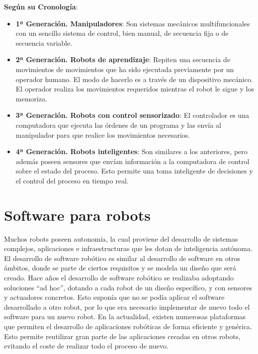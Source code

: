 \textbf{Según su Cronología}:
\begin{itemize}
\item \textbf{1ª Generación. Manipuladores}: Son sistemas mecánicos multifuncionales con un sencillo sistema de control, bien manual, de secuencia fija o de secuencia variable.

\item \textbf{2ª Generación. Robots de aprendizaje}: Repiten una secuencia de movimientos de movimientos que ha sido ejecutada previamente por un operador humano. El modo de hacerlo es a través de un dispositivo mecánico. El operador realiza los movimientos requeridos mientras el robot le sigue y los memoriza.

\item \textbf{3ª Generación. Robots con control sensorizado}: El controlador es una computadora que ejecuta las órdenes de un programa y las envía al manipulador para que realice los movimientos necesarios.

\item \textbf{4ª Generación. Robots inteligentes}: Son similares a los anteriores, pero además poseen sensores que envían información a la computadora de control sobre el estado del proceso. Esto permite una toma inteligente de decisiones y el control del proceso en tiempo real.
\end{itemize} 


\section{Software para robots}

Muchos robots poseen autonomía, la cual proviene del desarrollo de sistemas complejos, aplicaciones e infraestructuras que les dotan de inteligencia autónoma. El desarrollo de software robótico es similar al desarrollo de software en otros ámbitos, donde se parte de ciertos requisitos y se modela un diseño que será creado. Hace años el desarrollo de software robótico se realizaba adoptando soluciones ``ad hoc'', dotando a cada robot de un diseño específico, y con sensores y actuadores concretos. Esto suponía que no se podía aplicar el software desarrollado a otro robot, por lo que era necesario implementar de nuevo todo el software para un nuevo robot. En la actualidad, existen numerosas plataformas que permiten el desarrollo de aplicaciones robóticas de forma eficiente y genérica. Esto permite reutilizar gran parte de las aplicaciones creadas en otros robots, evitando el coste de realizar todo el proceso de nuevo.\\

